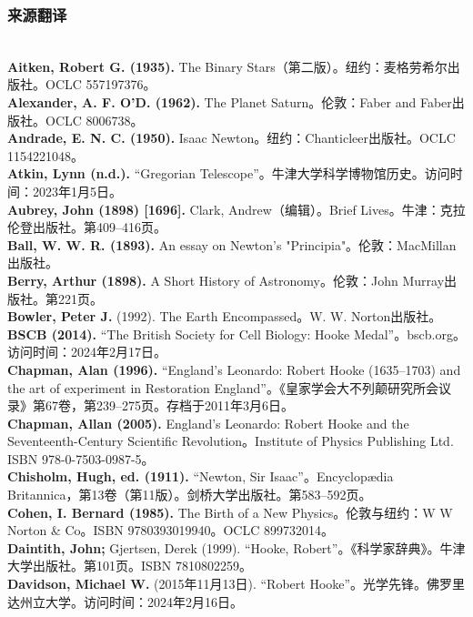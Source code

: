 \subsubsection{来源翻译}\\
\textbf{Aitken, Robert G. (1935).} The Binary Stars（第二版）。纽约：麦格劳希尔出版社。OCLC 557197376。\\
\textbf{Alexander, A. F. O'D. (1962).} The Planet Saturn。伦敦：Faber and Faber出版社。OCLC 8006738。\\
\textbf{Andrade, E. N. C. (1950).} Isaac Newton。纽约：Chanticleer出版社。OCLC 1154221048。\\
\textbf{Atkin, Lynn (n.d.). }“Gregorian Telescope”。牛津大学科学博物馆历史。访问时间：2023年1月5日。\\  
\textbf{Aubrey, John (1898) [1696]. }Clark, Andrew（编辑）。Brief Lives。牛津：克拉伦登出版社。第409–416页。\\ 
\textbf{Ball, W. W. R. (1893).} An essay on Newton's "Principia"。伦敦：MacMillan出版社。\\
\textbf{Berry, Arthur (1898).} A Short History of Astronomy。伦敦：John Murray出版社。第221页。\\
\textbf{Bowler, Peter J. }(1992). The Earth Encompassed。W. W. Norton出版社。\\  
\textbf{BSCB (2014). }“The British Society for Cell Biology: Hooke Medal”。bscb.org。访问时间：2024年2月17日。\\
\textbf{Chapman, Alan (1996). }“England's Leonardo: Robert Hooke (1635–1703) and the art of experiment in Restoration England”。《皇家学会大不列颠研究所会议录》第67卷，第239–275页。存档于2011年3月6日。\\
\textbf{Chapman, Allan (2005).} England's Leonardo: Robert Hooke and the Seventeenth-Century Scientific Revolution。Institute of Physics Publishing Ltd. ISBN 978-0-7503-0987-5。\\
\textbf{Chisholm, Hugh, ed. (1911).} “Newton, Sir Isaac”。Encyclopædia Britannica，第13卷（第11版）。剑桥大学出版社。第583–592页。\\
\textbf{Cohen, I. Bernard (1985). }The Birth of a New Physics。伦敦与纽约：W W Norton & Co。ISBN 9780393019940。OCLC 899732014。\\
\textbf{Daintith, John; }Gjertsen, Derek (1999). “Hooke, Robert”。《科学家辞典》。牛津大学出版社。第101页。ISBN 7810802259。\\
\textbf{Davidson, Michael W.} (2015年11月13日). “Robert Hooke”。光学先锋。佛罗里达州立大学。访问时间：2024年2月16日。\\
